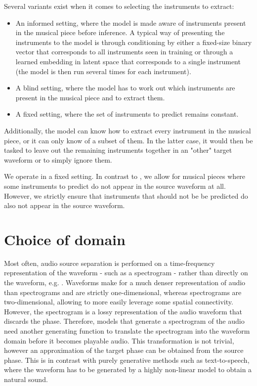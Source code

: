 \documentclass[twocolumn,superscriptaddress,aps]{revtex4-1}
\begin{document}
Several variants exist when it comes to selecting the instruments to extract:
\begin{itemize}
	\item An informed setting, where the model is made aware of instruments present in the musical piece before inference. A typical way of presenting the instruments to the model is through conditioning by either a fixed-size binary vector that corresponds to all instruments seen in training or through a learned embedding in latent space that corresponds to a single instrument (the model is then run several times for each instrument).
	\item A blind setting, where the model has to work out which instruments are present in the musical piece and to extract them.
	\item A fixed setting, where the set of instruments to predict remains constant.
\end{itemize}
Additionally, the model can know how to extract every instrument in the musical piece, or it can only know of a subset of them. In the latter case, it would then be tasked to leave out the remaining instruments together in an "other" target waveform or to simply ignore them.

We operate in a fixed setting. In contrast to \cite{SourceSeparationWaveformDomain}, we allow for musical pieces where some instruments to predict do not appear in the source waveform at all. However, we strictly ensure that instruments that should not be be predicted do also not appear in the source waveform.

\section{Choice of domain}
Most often, audio source separation is performed on a time-frequency representation of the waveform - such as a spectrogram - rather than directly on the waveform, e.g. \cite{DeepConvSep, Tacotron1}. Waveforms make for a much denser representation of audio than spectrograms and are strictly one-dimensional, whereas spectrograms are two-dimensional, allowing to more easily leverage some spatial connectivity. However, the spectrogram is a lossy representation of the audio waveform that discards the phase. Therefore, models that generate a spectrogram of the audio need another generating function to translate the spectrogram into the waveform domain before it becomes playable audio. This transformation is not trivial, however an approximation of the target phase can be obtained from the source phase. This is in contrast with purely generative methods such as text-to-speech, where the waveform has to be generated by a highly non-linear model to obtain a natural sound.
\end{document}
